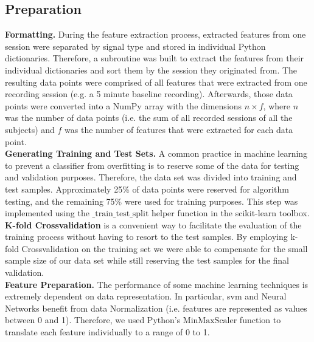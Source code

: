\subsection{Preparation} 
\textbf{Formatting.} During the feature extraction process, extracted features from one session were separated by signal type and stored in individual Python dictionaries. Therefore, a subroutine was built to extract the features from their individual dictionaries and sort them by the session they originated from. The resulting data points were comprised of all features that were extracted from one recording session (e.g. a 5 minute baseline recording).
Afterwards, those data points were converted into a NumPy array with the dimensions $n \times f$, where $n$ was the number of data points (i.e. the sum of all recorded sessions of all the subjects) and $f$ was the number of features that were extracted for each data point.\\
\textbf{Generating Training and Test Sets.} A common practice in machine learning to prevent a classifier from overfitting is to reserve some of the data for testing and validation purposes. Therefore, the data set was divided into training and test samples. Approximately 25\% of data points were reserved for algorithm testing, and the remaining 75\% were used for training purposes. This step was implemented using the $\text{\_train\_test\_split}$ helper function in the scikit-learn toolbox.\\
\textbf{K-fold Crossvalidation} is a convenient way to facilitate the evaluation of the training process without having to resort to the test samples. By employing k-fold Crossvalidation on the training set we were able to compensate for the small sample size of our data set while still reserving the test samples for the final validation.\\
\textbf{Feature Preparation.} The performance of some machine learning techniques is extremely dependent on data representation. In particular, \gls{svm} and Neural Networks benefit from data Normalization (i.e. features are represented as values between 0 and 1). Therefore, we used Python's $\text{MinMaxScaler}$ function to translate each feature individually to a range of 0 to 1.\\

\newpage
